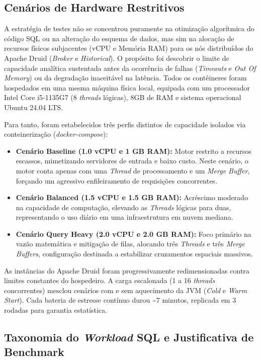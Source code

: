 \subsection{Cenários de Hardware Restritivos}

A estratégia de testes não se concentrou puramente na otimização algorítmica do código SQL ou na alteração do esquema de dados, mas sim na alocação de recursos físicos subjacentes (vCPU e Memória RAM) para os nós distribuídos do Apache Druid (\textit{Broker} e \textit{Historical}). O propósito foi descobrir o limite de capacidade analítica sustentada antes da ocorrência de falhas (\textit{Timeouts} e \textit{Out Of Memory}) ou da degradação inaceitável na latência. Todos os contêineres foram hospedados em uma mesma máquina física local, equipada com um processador Intel Core i5-1135G7 (8 \textit{threads} lógicas), 8GB de RAM e sistema operacional Ubuntu 24.04 LTS.

Para tanto, foram estabelecidos três perfis distintos de capacidade isolados via conteinerização (\textit{docker-compose}):

\begin{itemize}
    \item \textbf{Cenário Baseline (1.0 vCPU e 1 GB RAM):} Motor restrito a recursos escassos, mimetizando servidores de entrada e baixo custo. Neste cenário, o motor conta apenas com uma \textit{Thread} de processamento e um \textit{Merge Buffer}, forçando um agressivo enfileiramento de requisições concorrentes.
    \item \textbf{Cenário Balanced (1.5 vCPU e 1.5 GB RAM):} Acréscimo moderado na capacidade de computação, elevando as \textit{Threads} lógicas para duas, representando o uso diário em uma infraestrutura em nuvem mediana.
    \item \textbf{Cenário Query Heavy (2.0 vCPU e 2.0 GB RAM):} Foco primário na vazão matemática e mitigação de filas, alocando três \textit{Threads} e três \textit{Merge Buffers}, configuração destinada a estabilizar cruzamentos espaciais massivos.
\end{itemize}

As instâncias do Apache Druid foram progressivamente redimensionadas contra limites constantes do hospedeiro. A carga escalonada (1 a 16 \textit{threads} concorrentes) mesclou cenários com e sem aquecimento da JVM (\textit{Cold} e \textit{Warm Start}). Cada bateria de estresse contínuo durou \textasciitilde{}7 minutos, replicada em 3 rodadas para garantia estatística.

\subsection{Taxonomia do \textit{Workload} SQL e Justificativa de Benchmark}


